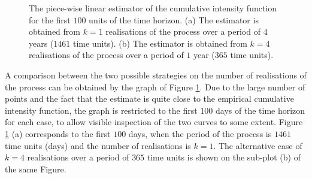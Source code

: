\documentclass[12pt]{article}
\theoremstyle{definition}
\begin{document}
 \begin{figure}[!ht]
    \centering
    \qquad
    \caption{The piece-wise linear estimator of the cumulative intensity function for the first $100$ units of the time horizon. (a) The estimator is obtained from $k=1$ realisations of the process over a period of $4$ years ($1461$ time units). (b) The estimator is obtained from $k=4$ realisations of the process over a period of $1$ year ($365$ time units).}%
    \label{fig:estimator14}
\end{figure}

A comparison between the two possible strategies on the number of realisations of the process can be obtained by the graph of Figure \ref{fig:estimator14}. 
Due to the large number of points and the fact that the estimate is quite close to the empirical cumulative intensity function, the graph is restricted to the first $100$ days of the time horizon for each case, to allow visible inspection of the two curves to some extent. Figure \ref{fig:estimator14} (a) corresponds to the first $100$ days, when the period of the process is $1461$ time units (days) and the number of realisations is $k=1$. The alternative case of $k=4$ realisations over a period of $365$ time units is shown on the sub-plot (b) of the same Figure. 
\end{document}
